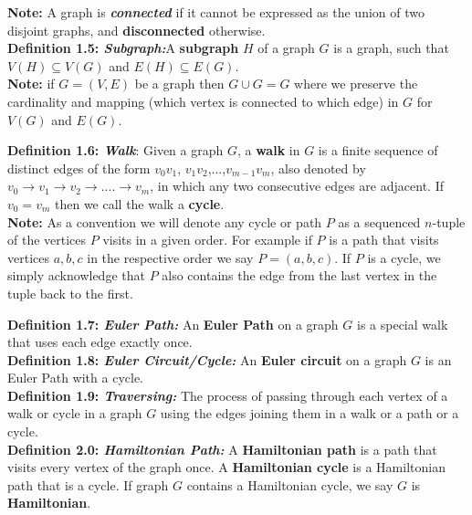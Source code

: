 \documentclass[12pt, fullpage]{article}
\begin{document}
\textbf{Note:} A graph is \textit{\textbf{connected}} if it cannot be expressed as the union of two disjoint graphs, and \textbf{disconnected} otherwise. \\

\textbf{Definition 1.5: \textit{Subgraph:}}A \textbf{subgraph} $H$ of a graph $G$ is a graph, such that $V(H) \subseteq V(G)$ and $E(H) \subseteq E(G)$.\\

\textbf{Note:} if $G=(V,E)$ be a graph then $G \cup G = G$ where we preserve the cardinality and mapping (which vertex is connected to which edge) in $G$ for $V(G)$ and $E(G)$.

\textbf{Definition 1.6: \textit{Walk}}: Given a graph $G$, a \textbf{walk} in $G$ is a finite sequence of distinct edges of the form $v_0v_1$, $v_1v_2$,...,$v_{m-1}v_m$, also denoted by $v_0 \rightarrow v_1 \rightarrow v_2 \rightarrow ....\rightarrow v_m$, in which any two consecutive edges are adjacent.  If $v_0 = v_m$ then we call the walk a \textbf{cycle}.\\
 \textbf{Note:} As a convention we will denote any cycle or path $P$ as a sequenced $n$-tuple of the vertices $P$ visits in a given order. For example if $P$ is a path that visits vertices $a,b,c$ in the respective order we say $P = (a,b,c)$. If $P$ is a cycle, we simply acknowledge that $P$ also contains the edge from the last vertex in the tuple back to the first.\newline

\textbf{Definition 1.7: \textit{Euler Path: }}An \textbf{Euler Path} on a graph $G$ is a special walk that uses each edge exactly once.\\

\textbf{Definition 1.8: \textit{Euler Circuit/Cycle: }}An \textbf{Euler circuit} on a graph $G$ is an Euler Path with a cycle.\\

\textbf{Definition 1.9: \textit{Traversing: }}The process of passing through each vertex of a  walk or cycle in a graph $G$ using the edges joining them in a walk or a path or a cycle.\\


\textbf{Definition 2.0: \textit{Hamiltonian Path:}} A \textbf{Hamiltonian path} is a path that visits every vertex of the graph once. A \textbf{Hamiltonian cycle} is a Hamiltonian path that is a cycle. If graph $G$ contains a Hamiltonian cycle, we say $G$ is \textbf{Hamiltonian}.
\newpage
\end{document}
